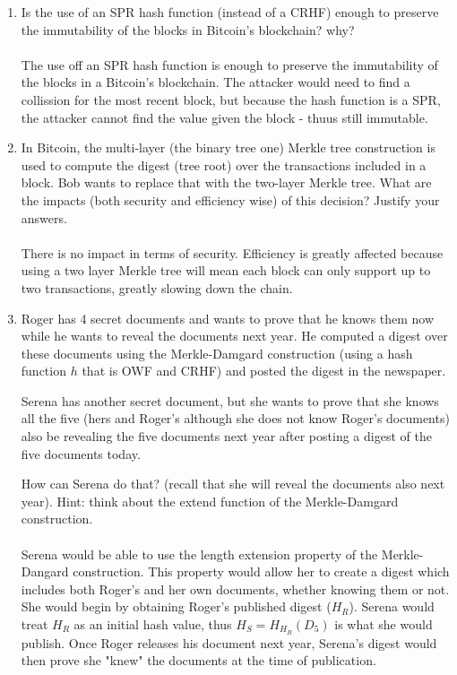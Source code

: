 \documentclass[12pt]{article}
\begin{document}
\begin{enumerate}
    \item Is the use of an SPR hash function (instead of a CRHF) enough to preserve the immutability of the blocks in Bitcoin's blockchain? why?
    \\\\The use off an SPR hash function is enough to preserve the immutability of the blocks in a Bitcoin's blockchain. The attacker would need to find a collission for the most recent block, but because the hash function is a SPR, the attacker cannot find the value given the block - thuus still immutable. 
    \item In Bitcoin, the multi-layer (the binary tree one) Merkle tree construction is used to compute the digest (tree root) over the transactions included in a block. Bob wants to replace that with the two-layer Merkle tree. What are the impacts (both security and efficiency wise) of this decision? Justify your answers.
    \\\\There is no impact in terms of security. Efficiency is greatly affected because using a two layer Merkle tree will mean each block can only support up to two transactions, greatly slowing down the chain. 
    \item Roger has 4 secret documents and wants to prove that he knows them now while he wants to reveal the documents next year. He computed a digest over these documents using the Merkle-Damgard construction (using a hash function $h$ that is OWF and CRHF) and posted the digest in the newspaper.

    Serena has another secret document, but she wants to prove that she knows all the five (hers and Roger's although she does not know Roger's documents) also be revealing the five documents next year after posting a digest of the five documents today.

    How can Serena do that? (recall that she will reveal the documents also next year). Hint: think about the extend function of the Merkle-Damgard construction.
    \\\\Serena would be able to use the length extension property of the Merkle-Dangard construction. This property would allow her to create a digest which includes both Roger's and her own documents, whether knowing them or not. She would begin by obtaining Roger's published digest ($H_R$). Serena would treat $H_R$ as an initial hash value, thus $H_S = H_{H_R}(D_5)$ is what she would publish. Once Roger releases his document next year, Serena's digest would then prove she "knew" the documents at the time of publication.   
\end{enumerate}
\end{document}
